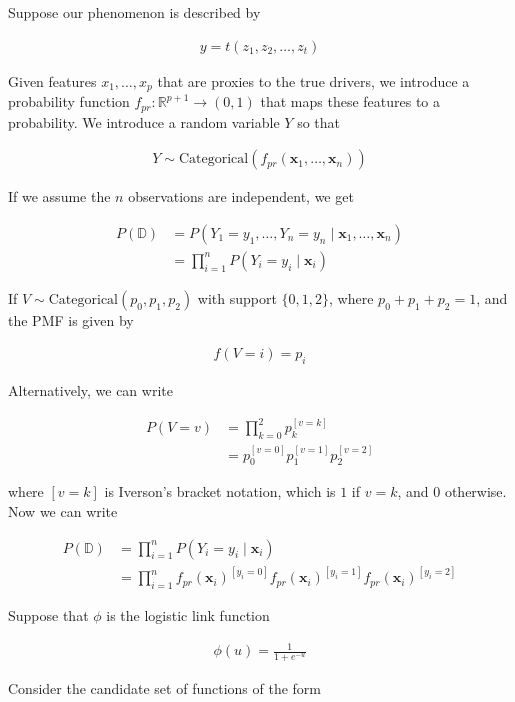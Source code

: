 \documentclass[12pt]{article}
\begin{document}
\begin{enumerate}
Suppose our phenomenon is described by

\begin{align*}
	y = t(z_1, z_2,\ldots,z_t)
\end{align*}

Given features $x_1,\ldots,x_p$ that are proxies to the true drivers, we introduce
a probability function $f_{pr}:\mathbb{R}^{p+1}\to(0,1)$ that maps these features
to a probability. We introduce a random variable $Y$ so that

\begin{align*}
	Y \sim \text{Categorical}(f_{pr}(\bm{x}_1,\ldots,\bm{x}_n))
\end{align*}

If we assume the $n$ observations are independent, we get

\begin{align*}
	P(\mathbb{D})
	&= P(Y_1 = y_1, \ldots, Y_n = y_n \mid \bm{x}_1,\ldots,\bm{x}_n)\\
	&=\prod_{i=1}^{n}P(Y_i=y_i \mid \bm{x}_i)
\end{align*}

If $V \sim \text{Categorical}(p_0,p_1, p_2)$ with support $\{0, 1, 2\}$,
where $p_0 + p_1 + p_2 = 1$, and the PMF is given by

\begin{align*}
	f(V = i) = p_i
\end{align*}

Alternatively, we can write

\begin{align*}
	P(V = v)
	&= \prod_{k=0}^{2}p_k^{[v=k]}\\
	&= p_0^{[v=0]} p_1^{[v=1]}p_2^{[v=2]}
\end{align*}

where $[v = k]$ is Iverson's bracket notation, which is $1$ if $v=k$, and $0$ otherwise.
Now we can write

\begin{align*}
	P(\mathbb{D})
	&= \prod_{i=1}^{n}P(Y_i = y_i \mid \bm{x}_i)\\
	&= \prod_{i=1}^{n} f_{pr}(\bm{x}_i)^{[y_i = 0]}f_{pr}(\bm{x}_i)^{[y_i = 1]}f_{pr}(\bm{x}_i)^{[y_i = 2]}
\end{align*}

Suppose that $\phi$ is the logistic link function

\begin{align*}
	\phi(u) = \frac{1}{1 + e^{-u}}
\end{align*}

Consider the candidate set of functions of the form


\end{enumerate}
\end{document}
